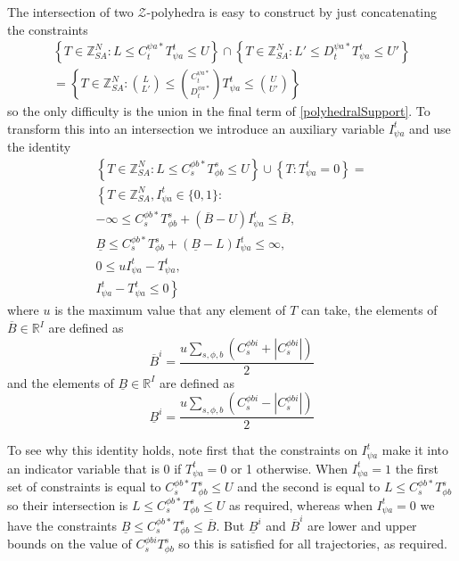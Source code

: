 \documentclass{article}
\begin{document}
The intersection of two $\mathcal{Z}$-polyhedra is easy to construct by just concatenating the constraints
\begin{multline}
\left\{ T\in\mathbb{\mathbb{Z}}^N_{SA} : L \le C^{\psi a*}_{t} T^t_{\psi a} \le U \right\}
\cap \left\{ T\in\mathbb{\mathbb{Z}}^N_{SA} : L' \le D^{\psi a *}_{t} T^t_{\psi a} \le U' \right\} \\
= \left\{ T\in\mathbb{\mathbb{Z}}^N_{SA} : {L \choose L'}  \le  {C^{\psi a*}_t \choose D^{\psi a*}_t} T^t_{\psi a} \le {U \choose U'} \right\}
\end{multline}
so the only difficulty is the union in the final term of \eqref{polyhedralSupport}. To transform this into an intersection we introduce an auxiliary variable $I^t_{\psi a}$ and use the identity
\begin{multline}
\left\{ T\in\mathbb{Z}^N_{SA} : L \le C^{\phi b*}_{s} T^s_{\phi b} \le U \right\}
\cup
\left\{T: T^t_{\psi a} = 0\right\}
=\\
\left\{
T\in\mathbb{Z}^N_{SA}, I^t_{\psi a}\in\{0,1\}:\right.\\
-\infty \le C^{\phi b *}_{s} T^s_{\phi b}
+
(\overline{B}-U)I^{t}_{\psi a}
\le \overline{B},\\
\underline{B} \le C^{\phi b *}_{s} T^s_{\phi b}
+
(\underline{B}-L)I^{t}_{\psi a} \le \infty,\\
0 \le uI^t_{\psi a} - T^t_{\psi a},\\
\left. I^t_{\psi a} - T^t_{\psi a} \le 0
\right\}
\label{implication}
\end{multline}
where $u$ is the maximum value that any element of $T$ can take, the elements of $\overline{B}\in\mathbb{R}^I$ are defined as
\[
\overline{B}^i = \frac{u\sum_{s,\phi,b} \left( C^{\phi bi}_{s} + \left|C^{\phi bi}_{s}\right|\right)}{2}
\]
and the elements of $\underline{B}\in\mathbb{R}^I$ are defined as
\[
\underline{B}^i = \frac{u\sum_{s,\phi,b} \left(C^{\phi bi}_{s} - \left|C^{\phi bi}_{s}\right|\right)}{2}
\]

To see why this identity holds, note first that the constraints on $I^t_{\psi a}$ make it into an indicator variable that is 0 if $T^t_{\psi a}=0$ or 1 otherwise. When $I^t_{\psi a}=1$ the first set of constraints is equal to $C^{\phi b*}_{s} T^s_{\phi b} \le U$ and the second is equal to $L \le C^{\phi b*}_{s} T^s_{\phi b}$ so their intersection is $L \le  C^{\phi b*}_{s} T^s_{\phi b} \le U$ as required, whereas when $I^t_{\psi a}=0$ we have the constraints $\underline{B} \le C^{\phi b*}_{s} T^s_{\phi b} \le \overline{B}$. But $\underline{B}^i$ and $\overline{B}^i$ are lower and upper bounds on the value of $C^{\phi bi}_{s} T^s_{\phi b}$ so this is satisfied for all trajectories, as required.
\end{document}
